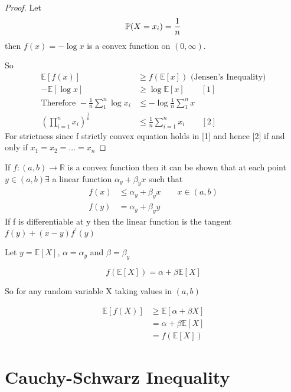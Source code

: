 \documentclass{notes}
\theoremstyle{plain}
\newcommand{\bP}{\mathbb{P}}
\newcommand{\bR}{\mathbb{R}}
\newcommand{\bE}{\mathbb{E}}
\newcommand{\prob}[1]{\bP \negthinspace\left(#1\right)}
\newcommand{\expect}[1]{\bE\!\left[#1\right]}
\begin{document}
\begin{proof}
Let 
\[
\prob{X=x_i} = \frac{1}{n}
\]
then $f(x) = - \log x$ is a convex function on $(0,\infty)$.

So
\begin{align*}
\expect{f(x)} &\geq f\left(\expect{x}\right) \text{ (Jensen's Inequality)}\\
-\expect{\log {x}} &\geq \log{\expect{x}} \qquad [1]\\
\text{Therefore } -\frac{1}{n} \sum_1^n \log{x_i} &\leq - \log{\frac{1}{n}\sum_1^nx}\\
\left(\prod_{i=1}^n x_i\right)^{\frac{1}{n}} &\leq \frac{1}{n}\sum_{i=1}^n x_i
\qquad [2]
\end{align*}
For strictness since f strictly convex equation holds in [1] and hence [2] if 
and only if $x_1=x_2=\dots=x_n$
\end{proof}
If $f:(a,b) \to \bR$ is a convex function then it can be shown that at each
point $y \in (a,b) \exists$ a linear function $\alpha_y + \beta_y x$ such that
\begin{align*}
f(x) &\leq \alpha_y + \beta_y x \qquad x \in (a,b)\\
f(y) &= \alpha_y  + \beta_y y
\end{align*}
If f is differentiable at y then the linear function is the tangent 
$f(y) + (x - y)f^{'}(y)$

\vspace{3in}

Let $y = \expect{X}$, $ \alpha = \alpha_y$ and $\beta = \beta_y$

\[
f\left(\expect{X}\right) = \alpha + \beta \expect{X}
\]

So for any random variable X taking values in $(a,b)$

\begin{align*}
\expect{f(X)} &\geq \expect{\alpha +\beta X}\\
&= \alpha +\beta\expect{X}\\
&= f\left(\expect{X}\right)
\end{align*}

\section{Cauchy-Schwarz Inequality}
\end{document}
